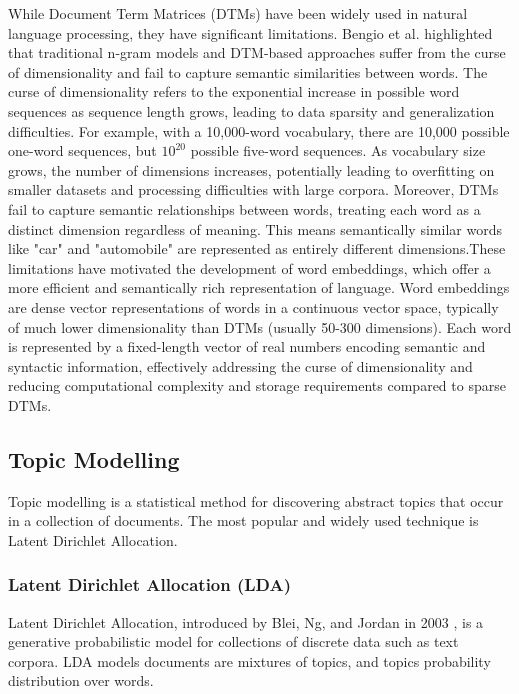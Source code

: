 \documentclass[a4paper, oneside]{discothesis}
\begin{document}
While Document Term Matrices (DTMs) have been widely used in natural language processing, they have significant limitations. Bengio et al. \cite{bengio2003neural} highlighted that traditional n-gram models and DTM-based approaches suffer from the curse of dimensionality and fail to capture semantic similarities between words.
The curse of dimensionality refers to the exponential increase in possible word sequences as sequence length grows, leading to data sparsity and generalization difficulties. For example, with a 10,000-word vocabulary, there are 10,000 possible one-word sequences, but $10^{20}$ possible five-word sequences.
As vocabulary size grows, the number of dimensions increases, potentially leading to overfitting on smaller datasets and processing difficulties with large corpora. Moreover, DTMs fail to capture semantic relationships between words, treating each word as a distinct dimension regardless of meaning. 
This means semantically similar words like "car" and "automobile" are represented as entirely different dimensions.These limitations have motivated the development of word embeddings, which offer a more efficient and semantically rich representation of language. 
Word embeddings are dense vector representations of words in a continuous vector space, typically of much lower dimensionality than DTMs (usually 50-300 dimensions). 
Each word is represented by a fixed-length vector of real numbers encoding semantic and syntactic information, effectively addressing the curse of dimensionality and reducing computational complexity and storage requirements compared to sparse DTMs.

\subsection{Topic Modelling}
Topic modelling is a statistical method for discovering abstract topics that occur in a collection of documents. The most popular and widely used technique is Latent Dirichlet Allocation.

\subsubsection{Latent Dirichlet Allocation (LDA)}
Latent Dirichlet Allocation, introduced by Blei, Ng, and Jordan in 2003 \cite{blei2003latent}, is a generative probabilistic model for collections of discrete data such as text corpora. 
LDA models documents are mixtures of topics, and topics probability distribution over words.
\end{document}
